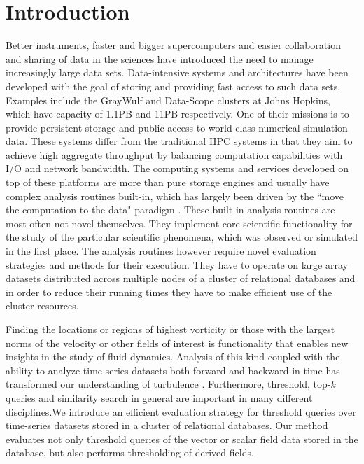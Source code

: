 \documentclass{sig-alternate}
\begin{document}
\section{Introduction}
Better instruments, faster and bigger supercomputers and easier collaboration and sharing of data in the sciences have introduced the need
to manage increasingly large data sets. Data-intensive systems and architectures have been developed with the goal of storing and providing
fast access to such data sets. Examples include the GrayWulf and Data-Scope clusters \cite{Szalay, DataScope} at Johns Hopkins, which have capacity 
of 1.1PB and 11PB
respectively. One of their missions is to provide persistent storage and public access to world-class numerical simulation data. 
These systems differ from the traditional HPC systems in that they aim to achieve high aggregate throughput by balancing computation
capabilities with I/O and network bandwidth. The computing systems and services developed on top of these platforms are more than pure
storage engines and usually have complex analysis routines built-in, which has largely been driven by the ``move the computation to the data"
paradigm \cite{fourthparadigm}. These built-in analysis routines are most often not novel themselves. They implement core scientific functionality for the
study of the particular scientific phenomena, which was observed or simulated in the first place. The analysis routines however require novel evaluation
strategies and methods for their execution. They have to operate on large array datasets distributed across multiple nodes of a cluster of relational
databases and in order to reduce their running times they have to make efficient use of the cluster resources. 

Finding the locations or regions of highest vorticity or those with the largest norms of the velocity or other fields of interest is
functionality that enables new insights in the study of fluid dynamics. Analysis of this kind coupled with the ability to analyze time-series datasets both 
forward and backward in time has transformed our understanding of turbulence \cite{Eyink}. Furthermore, threshold, top-$k$ queries and similarity search
in general are important in many different disciplines.We introduce an efficient evaluation strategy for threshold
queries over time-series datasets stored in a cluster of relational databases. Our method evaluates not only threshold queries of the vector or 
scalar field data stored in the database, but also performs thresholding of derived fields.
\end{document}
